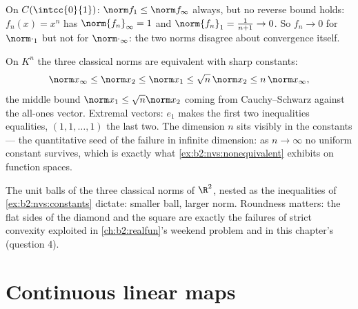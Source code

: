 \begin{example}\label{ex:b2:nvs:nonequivalent}
On $C(\intcc{0}{1})$: $\norm f_1 \leq \norm f_\infty$ always, but
no reverse bound holds: $f_n(x) = x^n$ has $\norm{f_n}_\infty = 1$
and $\norm{f_n}_1 = \frac{1}{n+1} \to 0$. So $f_n \to 0$ for
$\norm\cdot_1$ but not for $\norm\cdot_\infty$: the two norms
disagree about convergence itself.
\end{example}

\begin{example}\label{ex:b2:nvs:constants}
On $K^n$ the three classical norms are equivalent with sharp
constants:
\[
\norm x_\infty \leq \norm x_2 \leq \norm x_1
\leq \sqrt n\,\norm x_2 \leq n\,\norm x_\infty ,
\]
the middle bound $\norm x_1 \leq \sqrt n\norm x_2$ coming from
Cauchy--Schwarz against the all-ones vector. Extremal vectors:
$e_1$ makes the first two inequalities equalities, $(1, 1,
\dots, 1)$ the last two. The dimension $n$ sits visibly in the
constants --- the quantitative seed of the failure in infinite
dimension: as $n \to \infty$ no uniform constant survives,
which is exactly what \cref{ex:b2:nvs:nonequivalent} exhibits on
function spaces.
\end{example}

\begin{omfigure}

{\small The unit balls of the three classical norms of $\R^2$,
nested as the inequalities of \cref{ex:b2:nvs:constants}
dictate: smaller ball, larger norm. Roundness matters: the flat
sides of the diamond and the square are exactly the failures of
strict convexity exploited in \cref{ch:b2:realfun}'s weekend
problem and in this chapter's (question 4).}
\end{omfigure}

\section{Continuous linear maps}

